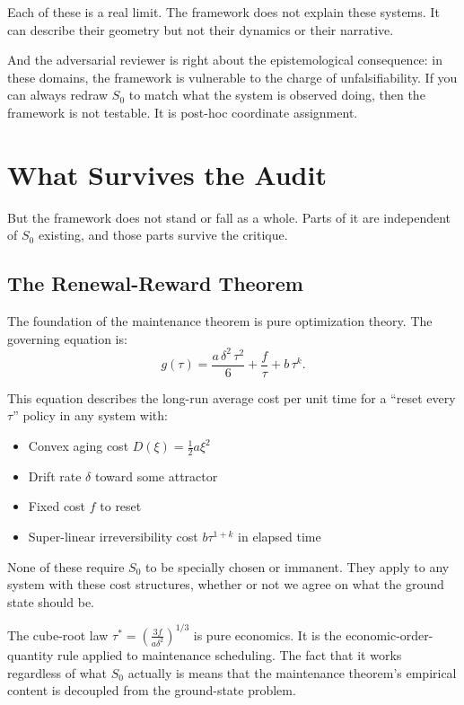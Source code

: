 \documentclass[12pt]{article}
\begin{document}
Each of these is a real limit. The framework does not explain these systems. It can describe their geometry but not their dynamics or their narrative.

And the adversarial reviewer is right about the epistemological consequence: in these domains, the framework is vulnerable to the charge of unfalsifiability. If you can always redraw $S_0$ to match what the system is observed doing, then the framework is not testable. It is post-hoc coordinate assignment.

\section{What Survives the Audit}

But the framework does not stand or fall as a whole. Parts of it are independent of $S_0$ existing, and those parts survive the critique.

\subsection{The Renewal-Reward Theorem}

The foundation of the maintenance theorem is pure optimization theory. The governing equation is:
$$g(\tau)=\frac{a\,\delta^2\,\tau^2}{6}+\frac{f}{\tau}+b\,\tau^{k}.$$

This equation describes the long-run average cost per unit time for a ``reset every $\tau$'' policy in any system with:
\begin{itemize}
\item Convex aging cost $D(\xi) = \tfrac{1}{2}a\xi^2$
\item Drift rate $\delta$ toward some attractor
\item Fixed cost $f$ to reset
\item Super-linear irreversibility cost $b\tau^{1+k}$ in elapsed time
\end{itemize}

None of these require $S_0$ to be specially chosen or immanent. They apply to any system with these cost structures, whether or not we agree on what the ground state should be.

The cube-root law $\tau^* = \left(\frac{3f}{a\delta^2}\right)^{1/3}$ is pure economics. It is the economic-order-quantity rule applied to maintenance scheduling. The fact that it works regardless of what $S_0$ actually is means that the maintenance theorem's empirical content is decoupled from the ground-state problem.
\end{document}
